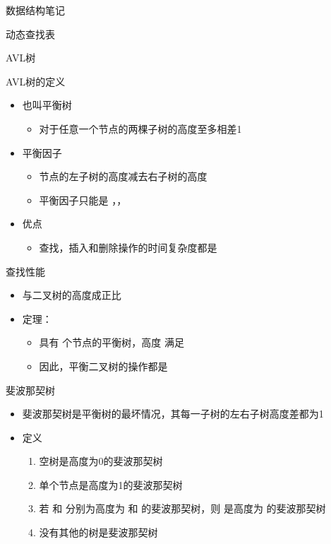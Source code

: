 \documentclass[
  ignorenonframetext,
]{beamer}
\providecommand{\tightlist}{%
  \setlength{\itemsep}{0pt}\setlength{\parskip}{0pt}}
\begin{document}
\begin{frame}[fragile]{数据结构笔记}
\begin{block}{动态查找表}
\begin{block}{AVL树}
\protect{}\label{avlux6811}
\begin{block}{AVL树的定义}
\protect{}\label{avlux6811ux7684ux5b9aux4e49}
\begin{itemize}
\tightlist
\item
  也叫平衡树

  \begin{itemize}
  \tightlist
  \item
    对于任意一个节点的两棵子树的高度至多相差1
  \end{itemize}
\item
  平衡因子

  \begin{itemize}
  \tightlist
  \item
    节点的左子树的高度减去右子树的高度
  \item
    平衡因子只能是 {}，{}，{}
  \end{itemize}
\item
  优点

  \begin{itemize}
  \tightlist
  \item
    查找，插入和删除操作的时间复杂度都是 {}
  \end{itemize}
\end{itemize}

\begin{block}{查找性能}
\protect{}\label{ux67e5ux627eux6027ux80fd}
\begin{itemize}
\item
  与二叉树的高度成正比
\item
  定理：

  \begin{itemize}
  \tightlist
  \item
    具有 {} 个节点的平衡树，高度 {} 满足 {}
  \item
    因此，平衡二叉树的操作都是 {}
  \end{itemize}
\end{itemize}
\end{block}

\begin{block}{斐波那契树}
\protect{}\label{ux6590ux6ce2ux90a3ux5951ux6811}
\begin{itemize}
\item
  斐波那契树是平衡树的最坏情况，其每一子树的左右子树高度差都为1
\item
  定义

  \begin{enumerate}
  \tightlist
  \item
    空树是高度为0的斐波那契树
  \item
    单个节点是高度为1的斐波那契树
  \item
    若 {} 和 {} 分别为高度为 {} 和 {} 的斐波那契树，则 {} 是高度为 {}
    的斐波那契树
  \item
    没有其他的树是斐波那契树
  \end{enumerate}
\end{itemize}


\end{block}
\end{block}
\end{block}
\end{block}
\end{frame}
\end{document}
